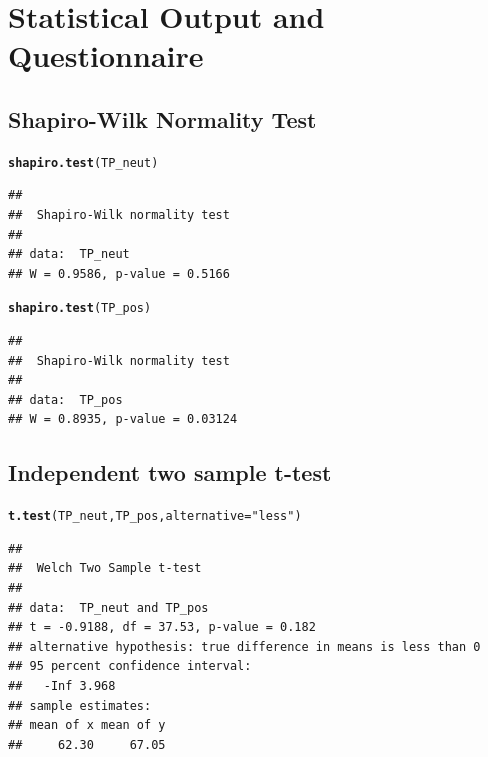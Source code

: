 \documentclass[	
	12pt, %
	a4paper, %
  abstracton
]{scrartcl}\usepackage[]{graphicx}\usepackage[]{color}
\makeatletter
\newcommand{\hlstr}[1]{\textcolor[rgb]{0.192,0.494,0.8}{#1}}%
\newcommand{\hlstd}[1]{\textcolor[rgb]{0.345,0.345,0.345}{#1}}%
\newcommand{\hlkwc}[1]{\textcolor[rgb]{0.333,0.667,0.333}{#1}}%
\newcommand{\hlkwd}[1]{\textcolor[rgb]{0.737,0.353,0.396}{\textbf{#1}}}%
\newenvironment{kframe}{%
 \def\at@end@of@kframe{}%
 \ifinner\ifhmode%
  \def\at@end@of@kframe{\end{minipage}}%
  \begin{minipage}{\columnwidth}%
 \fi\fi%
 \def\FrameCommand##1{\hskip\@totalleftmargin \hskip-\fboxsep
 \colorbox{shadecolor}{##1}\hskip-\fboxsep
     \hskip-\linewidth \hskip-\@totalleftmargin \hskip\columnwidth}%
 \MakeFramed {\advance\hsize-\width
   \@totalleftmargin\z@ \linewidth\hsize
   \@setminipage}}%
 {\par\unskip\endMakeFramed%
 \at@end@of@kframe}
\newenvironment{knitrout}{}{} %
\makeatother
\begin{document}
\newpage
\appendix
\section{Statistical Output and Questionnaire}
\subsection{Shapiro-Wilk Normality Test}



\begin{knitrout}\footnotesize
{}\color{fgcolor}\begin{kframe}
\begin{alltt}
\hlkwd{shapiro.test}\hlstd{(TP_neut)}
\end{alltt}
\begin{verbatim}
## 
## 	Shapiro-Wilk normality test
## 
## data:  TP_neut
## W = 0.9586, p-value = 0.5166
\end{verbatim}
\begin{alltt}
\hlkwd{shapiro.test}\hlstd{(TP_pos)}
\end{alltt}
\begin{verbatim}
## 
## 	Shapiro-Wilk normality test
## 
## data:  TP_pos
## W = 0.8935, p-value = 0.03124
\end{verbatim}
\end{kframe}
\end{knitrout}


\subsection{Independent two sample t-test}






\begin{knitrout}\footnotesize
{}\color{fgcolor}\begin{kframe}
\begin{alltt}
\hlkwd{t.test}\hlstd{(TP_neut, TP_pos,} \hlkwc{alternative} \hlstd{=} \hlstr{"less"}\hlstd{)}
\end{alltt}
\begin{verbatim}
## 
## 	Welch Two Sample t-test
## 
## data:  TP_neut and TP_pos
## t = -0.9188, df = 37.53, p-value = 0.182
## alternative hypothesis: true difference in means is less than 0
## 95 percent confidence interval:
##   -Inf 3.968
## sample estimates:
## mean of x mean of y 
##     62.30     67.05
\end{verbatim}
\end{kframe}
\end{knitrout}
\end{document}
